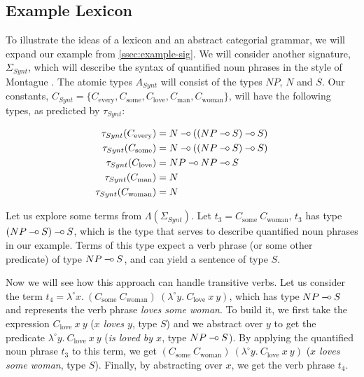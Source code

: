 \subsection{Example Lexicon}
\label{ssec:example-lex}

\newcommand{\synt}[1]{C_{\textrm{#1}}}

To illustrate the ideas of a lexicon and an abstract categorial grammar,
we will expand our example from \ref{ssec:example-sig}. We will
consider another signature, $\Sigma_{Synt}$, which will describe the
syntax of quantified noun phrases in the style of Montague
\cite{montague1973proper}. The atomic types $A_{Synt}$ will consist of
the types $NP$, $N$ and $S$. Our constants, $C_{Synt} = \{\synt{every},
\synt{some}, \synt{love}, \synt{man}, \synt{woman}\}$, will have the
following types, as predicted by $\tau_{Synt}$:

\begin{align*}
\tau_{Synt}(\synt{every}) &= N \limp ((NP \limp S) \limp S) \\
\tau_{Synt}(\synt{some}) &= N \limp ((NP \limp S) \limp S) \\
\tau_{Synt}(\synt{love}) &= NP \limp NP \limp S \\
\tau_{Synt}(\synt{man}) &= N \\
\tau_{Synt}(\synt{woman}) &= N
\end{align*}

Let us explore some terms from $\Lambda(\Sigma_{Synt})$. Let $t_3 =
\synt{some}\ \synt{woman}$, $t_3$ has type $(NP \mathbin{{-}\mkern-3.5mu{\circ}} S) \mathbin{{-}\mkern-3.5mu{\circ}} S$, which
is the type that serves to describe quantified noun phrases in our
example. Terms of this type expect a verb phrase (or some other
predicate) of type $NP \mathbin{{-}\mkern-3.5mu{\circ}} S$, and can yield a sentence of type $S$.

Now we will see how this approach can handle transitive verbs. Let us
consider the term $t_4 = \lambda^{\circ}
x.\ (\synt{some}\ \synt{woman})\ (\lambda^{\circ}
y.\ \synt{love}\ x\ y)$, which has type $NP \mathbin{{-}\mkern-3.5mu{\circ}} S$ and represents the
verb phrase \emph{loves some woman}. To build it, we first take the
expression $\synt{love}\ x\ y$ (\emph{$x$ loves $y$}, type $S$) and we
abstract over $y$ to get the predicate $\lambda^{\circ}
y.\ \synt{love}\ x\ y$ (\emph{is loved by $x$}, type $NP \mathbin{{-}\mkern-3.5mu{\circ}} S$). By
applying the quantified noun phrase $t_3$ to this term, we get
$(\synt{some}\ \synt{woman})\ (\lambda^{\circ} y.\ \synt{love}\ x\ y)$
(\emph{$x$ loves some woman}, type $S$). Finally, by abstracting over
$x$, we get the verb phrase $t_4$.

